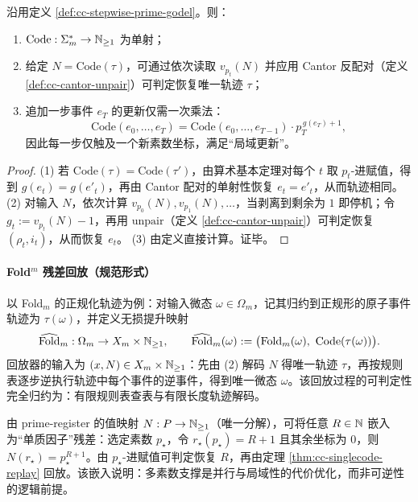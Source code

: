 \begin{theorem}\label{thm:cc-stepwise-prime-godel}
沿用定义 \ref{def:cc-stepwise-prime-godel}。则：
\begin{enumerate}
  \item $\mathrm{Code}:\Sigma_m^\ast\to\mathbb{N}_{\ge 1}$ 为单射；
  \item 给定 $N=\mathrm{Code}(\tau)$，可通过依次读取 $v_{p_t}(N)$ 并应用 Cantor 反配对（定义 \ref{def:cc-cantor-unpair}）可判定恢复唯一轨迹 $\tau$；
  \item 追加一步事件 $e_T$ 的更新仅需一次乘法：
  $$
  \mathrm{Code}(e_0,\dots,e_T)=\mathrm{Code}(e_0,\dots,e_{T-1})\cdot p_T^{\,g(e_T)+1},
  $$
  因此每一步仅触及一个新素数坐标，满足“局域更新”。
\end{enumerate}
\end{theorem}

\begin{proof}
(1) 若 $\mathrm{Code}(\tau)=\mathrm{Code}(\tau')$，由算术基本定理对每个 $t$ 取 $p_t$-进赋值，得到 $g(e_t)=g(e'_t)$，再由 Cantor 配对的单射性恢复 $e_t=e'_t$，从而轨迹相同。
(2) 对输入 $N$，依次计算 $v_{p_0}(N),v_{p_1}(N),\dots$，当剥离到剩余为 $1$ 即停机；令 $g_t:=v_{p_t}(N)-1$，再用 $\mathrm{unpair}$（定义 \ref{def:cc-cantor-unpair}）可判定恢复 $(\rho_t,i_t)$，从而恢复 $e_t$。
(3) 由定义直接计算。证毕。
\end{proof}

\paragraph{Fold$^m$ 残差回放（规范形式）}
以 Fold$_m$ 的正规化轨迹为例：对输入微态 $\omega\in\Omega_m$，记其归约到正规形的原子事件轨迹为 $\tau(\omega)$，并定义无损提升映射
$$
\widehat{\Fold}_m:\Omega_m\to X_m\times\NN_{\ge 1},\qquad
\widehat{\Fold}_m(\omega):=\bigl(\Fold_m(\omega),\ \mathrm{Code}(\tau(\omega))\bigr).
$$
回放器的输入为 $(x,N)\in X_m\times\mathbb{N}_{\ge 1}$：先由 (2) 解码 $N$ 得唯一轨迹 $\tau$，再按规则表逐步逆执行轨迹中每个事件的逆事件，得到唯一微态 $\omega$。该回放过程的可判定性完全归约为：有限规则表查表与有限长度轨迹解码。

\begin{remark}[把单码残差嵌入单一素数轴]
由 prime-register 的值映射 $N:P\to\mathbb{N}_{\ge 1}$（唯一分解），可将任意 $R\in\mathbb{N}$ 嵌入为“单质因子”残差：选定素数 $p_\star$，令 $r_\star(p_\star)=R+1$ 且其余坐标为 $0$，则 $N(r_\star)=p_\star^{R+1}$。由 $p_\star$-进赋值可判定恢复 $R$，再由定理 \ref{thm:cc-singlecode-replay} 回放。该嵌入说明：多素数支撑是并行与局域性的代价优化，而非可逆性的逻辑前提。
\end{remark}

